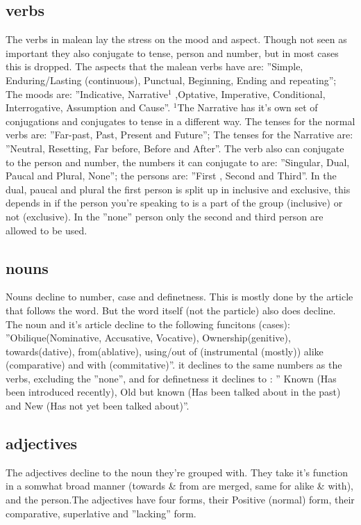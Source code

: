 \documentclass{article}
\begin{document}
\subsection{verbs}
The verbs in malean lay the stress on the mood and aspect. Though not seen as important they also conjugate to tense, person and number, but in most cases this is dropped. 
The aspects that the malean verbs have are: ''Simple, Enduring/Lasting (continuous), Punctual, Beginning, Ending and repeating''; The moods are: ''Indicative, Narrative$^{1}$ ,Optative, Imperative, Conditional, Interrogative, Assumption and Cause''. 
$^{1}$The Narrative has it's own set of conjugations and conjugates to tense in a different way. 
The tenses for the normal verbs are: ''Far-past, Past, Present and Future''; The tenses for the Narrative are: ''Neutral, Resetting, Far before, Before and After''. 
The verb also can conjugate to the person and number, the numbers it can conjugate to are: ''Singular, Dual, Paucal and Plural, None''; the persons are: ''First , Second and Third''. 
In the dual, paucal and plural the first person is split up in inclusive and exclusive, this depends in if the person you're speaking to is a part of the group (inclusive) or not (exclusive).
In the ''none'' person only the second and third person are allowed to be used.
\subsection{nouns}
Nouns decline to number, case and definetness. This is mostly done by the article that follows the word. But the word itself (not the particle) also does decline.
The noun and it's article decline to the following funcitons (cases): ''Obilique(Nominative, Accusative, Vocative), Ownership(genitive), towards(dative), from(ablative), using/out of (instrumental (mostly)) alike (comparative) and with (commitative)''.
it declines to the same numbers as the verbs, excluding the ''none'', and for definetness it declines to : '' Known (Has been introduced recently), Old but known (Has been talked about in the past) and New (Has not yet been talked about)''.
\subsection{adjectives}
The adjectives decline to the noun they're grouped with. They take it's function in a somwhat broad manner (towards \& from are merged, same for alike \& with), and the person.The adjectives have four forms, their Positive (normal) form, their comparative, superlative and ''lacking'' form.
\end{document}
